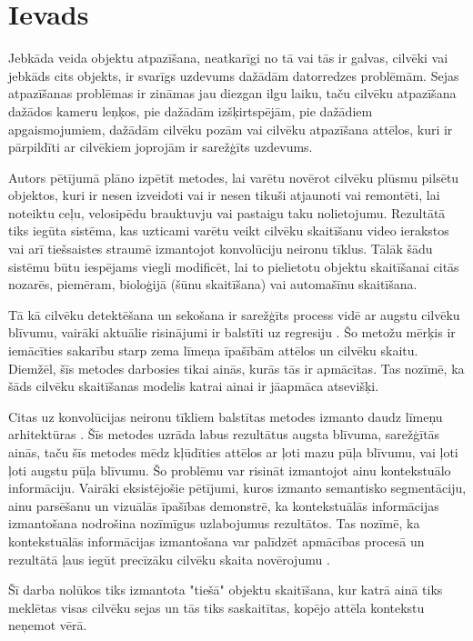 \chapter{Ievads}
Jebkāda veida objektu atpazīšana, neatkarīgi no tā vai tās ir galvas, cilvēki vai jebkāds cits objekts, ir svarīgs uzdevums dažādām datorredzes problēmām. Sejas atpazīšanas problēmas ir zināmas jau diezgan ilgu laiku, taču cilvēku atpazīšana dažādos kameru leņķos, pie dažādām izšķirtspējām, pie dažādiem apgaismojumiem, dažādām cilvēku pozām vai cilvēku atpazīšana attēlos, kuri ir pārpildīti ar cilvēkiem joprojām ir sarežģīts uzdevums.

Autors pētījumā plāno izpētīt metodes, lai varētu novērot cilvēku plūsmu pilsētu objektos, kuri ir nesen izveidoti vai ir nesen tikuši atjaunoti vai remontēti, lai noteiktu ceļu, velosipēdu brauktuvju vai pastaigu taku nolietojumu. Rezultātā tiks iegūta sistēma, kas uzticami varētu veikt cilvēku skaitīšanu video ierakstos vai arī tiešsaistes straumē izmantojot konvolūciju neironu tīklus. Tālāk šādu sistēmu būtu iespējams viegli modificēt, lai to pielietotu objektu skaitīšanai citās nozarēs, piemēram, bioloģijā (šūnu skaitīšana) vai automašīnu skaitīšana.

Tā kā cilvēku detektēšana un sekošana ir sarežģīts process vidē ar augstu cilvēku blīvumu, vairāki aktuālie risinājumi ir balstīti uz regresiju \cite{chen2012feature,chen2013cumulative}. Šo metožu mērķis ir iemācīties sakarību starp zema līmeņa īpašībām attēlos un cilvēku skaitu. Diemžēl, šīs metodes darbosies tikai ainās, kurās tās ir apmācītas. Tas nozīmē, ka šāds cilvēku skaitīšanas modelis katrai ainai ir jāapmāca atsevišķi.

Citas uz konvolūcijas neironu tīkliem balstītas metodes izmanto daudz līmeņu arhitektūras \cite{zhang2016single,onoro2016towards}. Šīs metodes uzrāda labus rezultātus augsta blīvuma, sarežģītās ainās, taču šīs metodes mēdz kļūdīties attēlos ar ļoti mazu pūļa blīvumu, vai ļoti ļoti augstu pūļa blīvumu. Šo problēmu var risināt izmantojot ainu kontekstuālo informāciju. Vairāki eksistējošie pētījumi, kuros izmanto semantisko segmentāciju, ainu parsēšanu un vizuālās īpašības demonstrē, ka kontekstuālās informācijas izmantošana nodrošina nozīmīgus uzlabojumus rezultātos. Tas nozīmē, ka kontekstuālās informācijas izmantošana var palīdzēt apmācības procesā un rezultātā ļaus iegūt precīzāku cilvēku skaita novērojumu \cite{sindagi2017generating}. 

Šī darba nolūkos tiks izmantota "tiešā" objektu skaitīšana, kur katrā ainā tiks meklētas visas cilvēku sejas un tās tiks saskaitītas, kopējo attēla kontekstu neņemot vērā.

